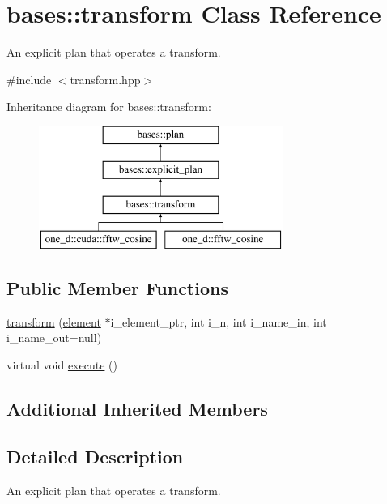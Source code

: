 \hypertarget{classbases_1_1transform}{\section{bases\-:\-:transform Class Reference}
\label{classbases_1_1transform}
}


An explicit plan that operates a transform.  




{\ttfamily \#include $<$transform.\-hpp$>$}

Inheritance diagram for bases\-:\-:transform\-:\begin{figure}[H]
\begin{center}
\leavevmode
\includegraphics[height=4.000000cm]{classbases_1_1transform}
\end{center}
\end{figure}
\subsection*{Public Member Functions}
\begin{DoxyCompactItemize}
\item 
\hyperlink{classbases_1_1transform_aed6db43964f71b42e3d81d884b26c2ad}{transform} (\hyperlink{classbases_1_1element}{element} $\ast$i\-\_\-element\-\_\-ptr, int i\-\_\-n, int i\-\_\-name\-\_\-in, int i\-\_\-name\-\_\-out=null)
\begin{DoxyCompactList}\small\item\em \end{DoxyCompactList}\item 
virtual void \hyperlink{classbases_1_1transform_a888d2b74131cea34af277fdf564dbb3d}{execute} ()
\end{DoxyCompactItemize}
\subsection*{Additional Inherited Members}


\subsection{Detailed Description}
An explicit plan that operates a transform. 



